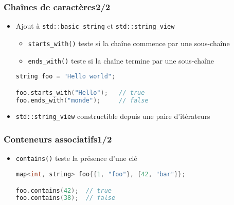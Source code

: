 \documentclass[C++.tex]{subfiles}
\begin{document}
\begin{frame}[fragile]
	\frametitle{Chaînes de caractères\titlehfill{}2/2}
	\begin{itemize}
		\item Ajout à \lstinline|std::basic_string| et \lstinline|std::string_view|
		\begin{itemize}
			\item \lstinline|starts_with()| teste si la chaîne commence par une sous-chaîne
			\item \lstinline|ends_with()| teste si la chaîne termine par une sous-chaîne
		\end{itemize}

	\begin{lstlisting}[language=C++]
string foo = "Hello world";

foo.starts_with("Hello");   // true
foo.ends_with("monde");     // false\end{lstlisting}

		\item \lstinline|std::string_view| constructible depuis une paire d'itérateurs
	\end{itemize}
\end{frame}

\begin{frame}[fragile]
	\frametitle{Conteneurs associatifs\titlehfill{}1/2}
	\begin{itemize}
		\item \lstinline|contains()| teste la présence d'une clé


		\begin{lstlisting}[language=C++]
map<int, string> foo{{1, "foo"}, {42, "bar"}};

foo.contains(42);  // true
foo.contains(38);  // false\end{lstlisting}
	\end{itemize}
\end{frame}
\end{document}
